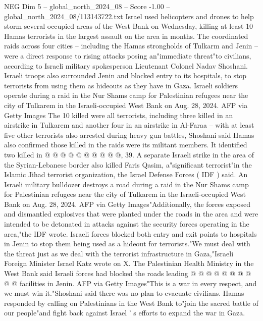 \begin{textsample}{NEG Dim 5 – global\_north\_2024\_08 – Score -1.00 – global\_north\_2024\_08/113143722.txt}  \label{ex:f5_neg_061}
Israel used helicopters and drones to help storm several occupied areas of the West Bank on Wednesday, killing at least 10 Hamas terrorists in the largest assault on the area in months.
The coordinated raids across four cities -- including the Hamas strongholds of Tulkarm and Jenin -- were a direct response to rising attacks posing an"immediate threat"to civilians, according to Israeli military spokesperson Lieutenant Colonel Nadav Shoshani.
Israeli troops also surrounded Jenin and blocked entry to its hospitals, to stop terrorists from using them as hideouts as they have in Gaza.
Israeli soldiers operate during a raid in the Nur Shams camp for Palestinian refugees near the city of Tulkarem in the Israeli-occupied West Bank on Aug. 28, 2024.
AFP via Getty Images The 10 killed were all terrorists, including three killed in an airstrike in Tulkarem and another four in an airstrike in Al-Faraa -- with at least five other terrorists also arrested during heavy gun battles, Shoshani said Hamas also confirmed those killed in the raids were its militant members.
It identified two killed in @ @ @ @ @ @ @ @ @ @, 39.
A separate Israeli strike in the area of the Syrian-Lebanese border also killed Faris Qasim, a"significant terrorist"in the Islamic Jihad terrorist organization, the Israel Defense Forces ( IDF ) said.
An Israeli military bulldozer destroys a road during a raid in the Nur Shams camp for Palestinian refugees near the city of Tulkarem in the Israeli-occupied West Bank on Aug. 28, 2024.
AFP via Getty Images"Additionally, the forces exposed and dismantled explosives that were planted under the roads in the area and were intended to be detonated in attacks against the security forces operating in the area,"the IDF wrote.
Israeli forces blocked both entry and exit points to hospitals in Jenin to stop them being used as a hideout for terrorists."We must deal with the threat just as we deal with the terrorist infrastructure in Gaza,"Israeli Foreign Minister Israel Katz wrote on X.
The Palestinian Health Ministry in the West Bank said Israeli forces had blocked the roads leading @ @ @ @ @ @ @ @ @ @ facilities in Jenin.
AFP via Getty Images"This is a war in every respect, and we must win it."Shoshani said there was no plan to evacuate civilians.
Hamas responded by calling on Palestinians in the West Bank to"join the sacred battle of our people"and fight back against Israel ' s efforts to expand the war in Gaza.

\end{textsample}
